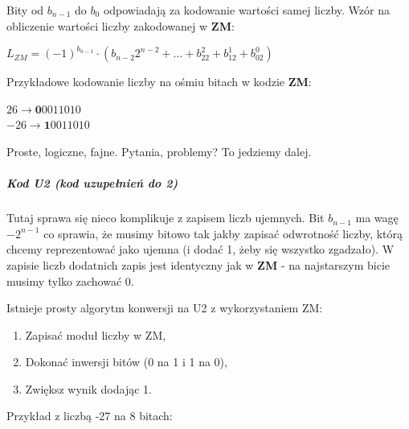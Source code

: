 \documentclass[a4paper,12pt,oneside]{book}
\begin{document}
Bity od $b_{n-1}$ do $b_0$ odpowiadają za kodowanie wartości samej liczby. Wzór na obliczenie wartości liczby zakodowanej w \textbf{ZM}:
\begin{center}
	$L_{ZM} = (-1)^{b_{n-1}} \cdot (b_{n-2}2^{n-2} + ... + b_22^2 + b_12^1 + b_02^0)$
\end{center}

Przykładowe kodowanie liczby na ośmiu bitach w kodzie \textbf{ZM}:
\begin{center}
	$26 \longrightarrow \textbf{0}0011010 $\\
	$-26 \longrightarrow \textbf{1}0011010 $
\end{center}

Proste, logiczne, fajne. Pytania, problemy? To jedziemy dalej.

	
\subparagraph{Kod \textbf{U2} (kod uzupełnień do 2)}

Tutaj sprawa się nieco komplikuje z zapisem liczb ujemnych. Bit $b_{n-1}$ ma wagę $-2^{n-1}$ co sprawia, że musimy bitowo tak jakby zapisać odwrotność liczby, którą chcemy reprezentować jako ujemna (i dodać 1, żeby się wszystko zgadzało). W zapisie liczb dodatnich zapis jest identyczny jak w \textbf{ZM} - na najstarszym bicie musimy tylko zachować $0$.

Istnieje prosty algorytm konwersji na U2 z wykorzystaniem ZM:
\begin{enumerate}
	\item Zapisać moduł liczby w ZM,
	\item Dokonać inwersji bitów (0 na 1 i 1 na 0),
	\item Zwiększ wynik dodając 1.
\end{enumerate}

Przykład z liczbą -27 na 8 bitach:

\end{document}
